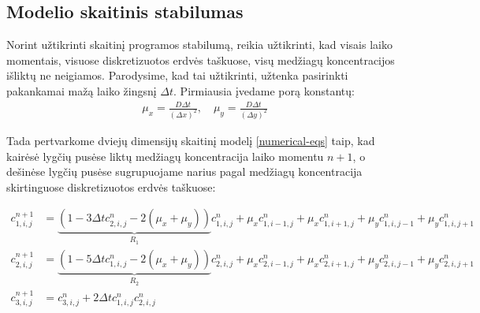 \subsection{Modelio skaitinis stabilumas}

Norint užtikrinti skaitinį programos stabilumą, reikia užtikrinti, kad visais laiko momentais, visuose diskretizuotos erdvės taškuose, visų medžiagų koncentracijos išliktų ne neigiamos. Parodysime, kad tai užtikrinti, užtenka pasirinkti pakankamai mažą laiko žingsnį $\Delta t$. Pirmiausia įvedame porą konstantų:
\begin{align*}
\mu_x = \frac{D\Delta t}{(\Delta x)^2}, \quad
\mu_y = \frac{D\Delta t}{(\Delta y)^2}
\end{align*}

Tada pertvarkome dviejų dimensijų skaitinį modelį \eqref{numerical-eqs} taip, kad kairėsė lygčių pusėse liktų medžiagų koncentracija laiko momentu $n+1$, o dešinėse lygčių pusėse sugrupuojame narius pagal medžiagų koncentracija skirtinguose diskretizuotos erdvės taškuose:

\begin{subequations} \label{eqs:r-coefs}
    \begin{align}
    c^{n+1}_{1,i,j}&=\underbrace{(1-3\Delta tc^{n}_{2,i,j}-2(\mu_x+\mu_y))}_{R_1}c^n_{1,i,j}+\mu_xc^n_{1,i-1,j}+\mu_xc^n_{1,i+1,j}+\mu_yc^n_{1,i,j-1}+\mu_yc^n_{1,i,j+1} \label{r-coefs1}\\
    c^{n+1}_{2,i,j}&=\underbrace{(1-5\Delta tc^{n}_{1,i,j}-2(\mu_x+\mu_y))}_{R_2}c^n_{2,i,j}+\mu_xc^n_{2,i-1,j}+\mu_xc^n_{2,i+1,j}+\mu_yc^n_{2,i,j-1}+\mu_yc^n_{2,i,j+1} \label{r-coefs2}\\
    c^{n+1}_{3,i,j}&=c^n_{3,i,j}+2\Delta tc^{n}_{1,i,j}c^{n}_{2,i,j} \label{r-coefs3}
    \end{align}
\end{subequations}


